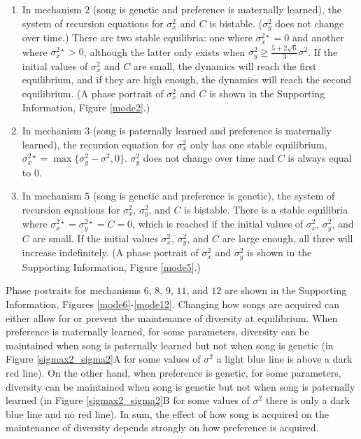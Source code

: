 \documentclass[12pt]{article}
\begin{document}
\begin{enumerate}
\item
In mechanism $2$ (song is genetic and preference is maternally learned), the system of recursion equations for $\sigma_x^2$ and $C$ is bistable. ($\sigma_y^2$ does not change over time.) There are two stable equilibria: one where $\sigma_x^{2\star}=0$ and another where $\sigma_x^{2\star}>0$, although the latter only exists when $\sigma_y^2\geq\frac{5+2\sqrt{6}}{3}\sigma^2$. If the initial values of $\sigma_x^2$ and $C$ are small, the dynamics will reach the first equilibrium, and if they are high enough, the dynamics will reach the second equilibrium. (A phase portrait of $\sigma_x^2$ and $C$ is shown in the Supporting Information, Figure \ref{mode2}.) 
\item In mechanism $3$ (song is paternally learned and preference is maternally learned), the recursion equation for $\sigma_x^2$ only has one stable equilibrium, $\sigma_x^{2\star}=\max\{\sigma_y^2-\sigma^2,0\}$. $\sigma_y^2$ does not change over time and $C$ is always equal to $0$.
\item In mechanism $5$ (song is genetic and preference is genetic), the system of recursion equations for $\sigma_x^2$, $\sigma_y^2$, and $C$ is bistable. There is a stable equilibria where $\sigma_x^{2\star}=\sigma_y^{2\star}=C=0$, which is reached if the initial values of $\sigma_x^2$, $\sigma_y^2$, and $C$ are small. If the initial values $\sigma_x^2$, $\sigma_y^2$, and $C$ are large enough, all three will increase indefinitely. (A phase portrait of $\sigma_x^2$ and $\sigma_y^2$ is shown in the Supporting Information, Figure \ref{mode5}.)
\end{enumerate}
Phase portraits for mechanisms $6$, $8$, $9$, $11$, and $12$ are shown in the Supporting Information, Figures \ref{mode6}-\ref{mode12}.
Changing how songs are acquired can either allow for or prevent the maintenance of diversity at equilibrium. When preference is maternally learned, for some parameters, diversity can be maintained when song is paternally learned but not when song is genetic (in Figure \ref{sigmax2_sigma2}A for some values of $\sigma^2$ a light blue line is above a dark red line). On the other hand, when preference is genetic, for some parameters, diversity can be maintained when song is genetic but not when song is paternally learned (in Figure \ref{sigmax2_sigma2}B for some values of $\sigma^2$ there is only a dark blue line and no red line). In sum, the effect of how song is acquired on the maintenance of diversity depends strongly on how preference is acquired.
\end{document}
